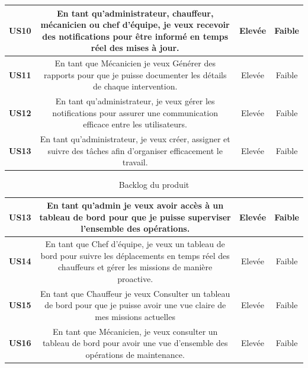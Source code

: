 \begin{table}[htbp]
\begin{tabular}{|c|c|c|c|}
        
        \hline
        \textbf{US10} & \parbox{10cm}{\centering En tant qu’administrateur, chauffeur, mécanicien ou chef d’équipe, je veux recevoir des notifications pour être informé en temps réel des mises à jour.} & Elevée & Faible \\
        \hline
        \textbf{US11} & \parbox{10cm}{\centering En tant que Mécanicien je veux Générer des rapports pour que je puisse documenter les détails de chaque intervention.} & Elevée & Faible  \\
        \hline
        \textbf{US12} & \parbox{10cm}{\centering En tant qu'administrateur, je veux gérer les notifications pour assurer une communication efficace entre les utilisateurs.} & Elevée & Faible  \\
        \hline
        \textbf{US13} & \parbox{10cm}{\centering En tant qu'administrateur, je veux créer, assigner et suivre des tâches afin d'organiser efficacement le travail.} & Elevée & Faible  \\
        \hline


   \end{tabular}
\end{table}


        
        
    \begin{table}[htbp]
    \centering
    \renewcommand{\arraystretch}{4.15} %
    \begin{tabular}{|c|c|c|c|}
        \hline
        \textbf{US13} & \parbox{11.3cm}{\centering En tant qu'admin je veux avoir accès à un tableau de bord pour que je puisse superviser l'ensemble des opérations.} & Elevée & Faible \\
        \hline
        \textbf{US14} &\parbox{11.3cm}{\centering En tant que Chef d'équipe, je veux un tableau de bord pour suivre les déplacements en temps réel des chauffeurs et gérer les missions de manière proactive.} & Elevée & Faible \\
        \hline
        \textbf{US15} & \parbox{11.3cm}{\centering En tant que Chauffeur je veux Consulter un tableau de bord pour que je puisse avoir une vue claire de mes missions actuelles} & Elevée & Faible \\
        \hline
        \textbf{US16} & \parbox{11.3cm}{\centering En tant que Mécanicien, je veux consulter un tableau de bord pour avoir une vue d'ensemble des opérations de maintenance.} & Elevée & Faible  \\
        \hline
    \end{tabular}
\bigskip
    \caption{Backlog du produit}
    \label{tab:my_label}
\end{table}



